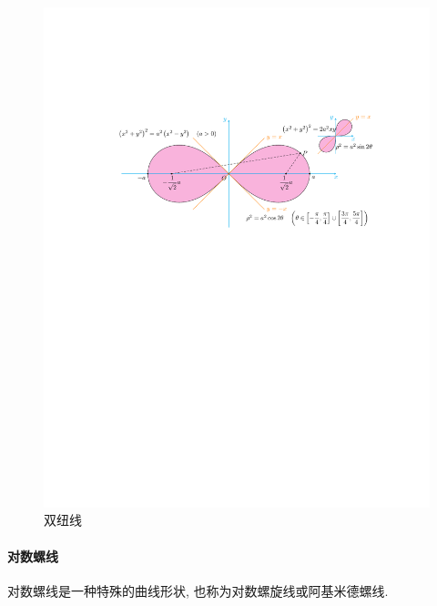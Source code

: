 \begin{figure}[H]
    \centering
    \includegraphics{figures/DoubleTwistedWire.pdf}
    \caption{双纽线}
    \label{doubleTwistedWire}
\end{figure}

\paragraph{对数螺线}

对数螺线是一种特殊的曲线形状, 也称为对数螺旋线或阿基米德螺线. 


